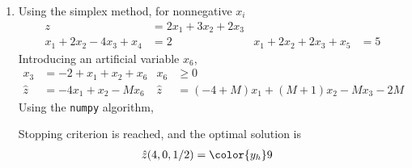\begin{enumerate}
    \item Using the simplex method, for nonnegative $ x_i $
          \begin{align}
              z                       & = 2x_1 + 3x_2 + 2x_3   \\
              x_1 + 2x_2 - 4x_3 + x_4 & = 2                  &
              x_1 + 2x_2 + 2x_3 + x_5 & = 5
          \end{align}
          Introducing an artificial variable $ x_6 $,
          \begin{align}
              x_3     & = -2 + x_1 + x_2 + x_6              &
              x_6     & \geq 0                                \\
              \hat{z} & = -4x_1 + x_2 - Mx_6                &
              \hat{z} & = (-4+M) x_1 + (M+1)x_2 - Mx_3 - 2M
          \end{align}
          Using the \texttt{numpy} algorithm, \par
          Stopping criterion is reached, and the optimal solution is
          \begin{align}
              \hat{z}(4, 0,1/2) & = \color{y_h}9
          \end{align}
\end{enumerate}